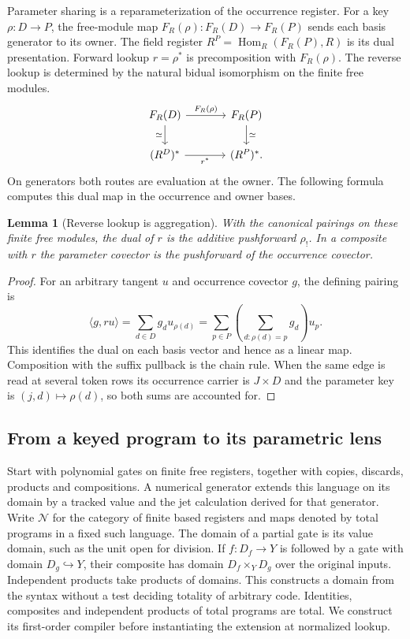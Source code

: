 \documentclass[11pt,a4paper]{article}
\newtheorem{lemma}[lemma]{Lemma}
\theoremstyle{definition}
\theoremstyle{remark}\newaliascnt{remark}{theorem}
\newcommand{\Hom}{\operatorname{Hom}}
\numberwithin{equation}{section}
\begin{document}
Parameter sharing is a reparameterization of the occurrence register. For a key \(\rho:D\to P\), the free-module map \(F_R(\rho):F_R(D)\to F_R(P)\) sends each basis generator to its owner. The field register \(R^P=\Hom_R(F_R(P),R)\) is its dual presentation. Forward lookup \(r=\rho^*\) is precomposition with \(F_R(\rho)\). The reverse lookup is determined by the natural bidual isomorphism on the finite free modules.
\[
\begin{tikzcd}[column sep=large]
 F_R(D)\arrow[r,"F_R(\rho)"]\arrow[d,"\simeq"']&
 F_R(P)\arrow[d,"\simeq"]\\
 (R^D)^*\arrow[r,"r^*"']&(R^P)^* .
\end{tikzcd}
\]
On generators both routes are evaluation at the owner. The following formula computes this dual map in the occurrence and owner bases.
\begin{lemma}[Reverse lookup is aggregation]\label{lem:sharing}
With the canonical pairings on these finite free modules, the dual of \(r\) is the additive pushforward \(\rho_!\). In a composite with \(r\) the parameter covector is the pushforward of the occurrence covector.
\end{lemma}
\begin{proof}
For an arbitrary tangent \(u\) and occurrence covector \(g\), the defining pairing is
\[
 \langle g,r u\rangle=\sum_{d\in D}g_d u_{\rho(d)}
   =\sum_{p\in P}\left(\sum_{d:\rho(d)=p}g_d\right)u_p.
\]
This identifies the dual on each basis vector and hence as a linear map. Composition with the suffix pullback is the chain rule. When the same edge is read at several token rows its occurrence carrier is \(J\times D\) and the parameter key is \((j,d)\mapsto\rho(d)\), so both sums are accounted for.
\end{proof}

\subsection{From a keyed program to its parametric lens}

Start with polynomial gates on finite free registers, together with copies, discards, products and compositions. A numerical generator extends this language on its domain by a tracked value and the jet calculation derived for that generator. Write $\mathcal N$ for the category of finite based registers and maps denoted by total programs in a fixed such language. The domain of a partial gate is its value domain, such as the unit open for division. If $f:D_f\to Y$ is followed by a gate with domain $D_g\hookrightarrow Y$, their composite has domain $D_f\times_Y D_g$ over the original inputs. Independent products take products of domains. This constructs a domain from the syntax without a test deciding totality of arbitrary code. Identities, composites and independent products of total programs are total. We construct its first-order compiler before instantiating the extension at normalized lookup.
\end{document}
